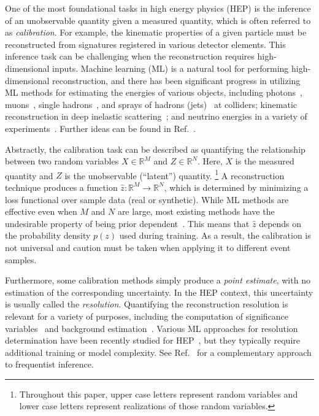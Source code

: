 \documentclass[prl,twocolumn,superscriptaddress,longbibliography,preprintnumbers,floatfix,nofootinbib]{revtex4-1}
\DeclareRobustCommand{\Ref}[1]{Ref.~\cite{#1}}
\begin{document}
One of the most foundational tasks in high energy physics (HEP) is the inference of an unobservable quantity given a  measured quantity, which is often referred to as \textit{calibration}.
%
For example, the kinematic properties of a given particle must be reconstructed from signatures registered in various detector elements.
%
This inference task can be challenging when the reconstruction requires high-dimensional inputs.
%
Machine learning (ML) is a natural tool for performing high-dimensional reconstruction, and there has been significant progress in utilizing ML methods for estimating the energies of various objects, including
photons~\cite{CMS:2020uim},
muons~\cite{Kieseler:2021jxc},
single hadrons~\cite{Belayneh:2019vyx,ATL-PHYS-PUB-2020-018,Akchurin:2021afn,Akchurin:2021ahx,Polson:2021kvr,Pata:2021oez},
and sprays of hadrons (jets)~\cite{ATL-PHYS-PUB-2018-013,ATL-PHYS-PUB-2020-001,CMS:2019uxx,Haake:2018hqn,Haake:2019pqd,Baldi:2020hjm,Komiske:2017ubm,ATL-PHYS-PUB-2019-028,Maier:2021ymx,Kasieczka:2020vlh,ArjonaMartinez:2018eah} at colliders;
kinematic reconstruction in deep inelastic scattering~\cite{Diefenthaler:2021rdj,Arratia:2021tsq};
and neutrino energies in a variety of experiments~\cite{Liu:2020pzv,EXO:2018bpx,Baldi:2018qhe,Abbasi:2021ryj,IceCube:2020yct,Carloni:2021zbc}.
%
Further ideas can be found in \Ref{Feickert:2021ajf}.


Abstractly, the calibration task can be described as quantifying the relationship between two random variables $X\in\mathbb{R}^M$ and $Z\in\mathbb{R}^N$.
%
Here, $X$ is the measured quantity and $Z$ is the unobservable (``latent'') quantity.%
%
\footnote{Throughout this paper, upper case letters represent random variables and lower case letters represent realizations of those random variables.}
%
A reconstruction technique produces a function $\hat{z}:\mathbb{R}^M\rightarrow\mathbb{R}^N$, which is determined by minimizing a loss functional over sample data (real or synthetic).
%
While ML methods are effective even when $M$ and $N$ are large, most existing methods have the undesirable property of being prior dependent~\cite{priordependence}.
%
This means that $\hat{z}$ depends on the probability density $p(z)$ used during training.
%
As a result, the calibration is not universal and caution must be taken when applying it to different event samples. 


Furthermore, some calibration methods simply produce a \textit{point estimate}, with no estimation of the corresponding uncertainty.
%
In the HEP context, this uncertainty is usually called the \textit{resolution}.
%
Quantifying the reconstruction resolution is relevant for a variety of purposes, including
the computation of significance variables~\cite{CMS:2019ctu,Nachman:2013bia} and
background estimation~\cite{ATLAS:2012qgw,ATLAS:2021kxv}.
%
Various ML approaches for resolution determination have been recently studied for HEP~\cite{Sirunyan:2019wwa,Cheong:2019upg,Bollweg:2019skg,Bellagente:2021yyh,1806026,Araz:2021wqm,Kronheim:2021hdb}, but they typically require additional training or model complexity.
%
See \Ref{https://doi.org/10.48550/arxiv.2107.03920} for a complementary approach to frequentist inference.
\end{document}
